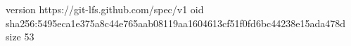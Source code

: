 version https://git-lfs.github.com/spec/v1
oid sha256:5495eca1e375a8c44e765aab08119aa1604613cf51f0fd6bc44238e15ada478d
size 53
